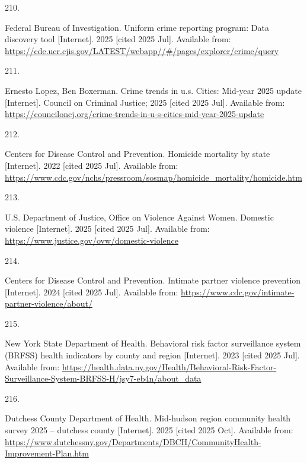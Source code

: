 \documentclass[
  english,
  letterpaper,
]{report}
\newlength{\cslhangindent}
\newlength{\csllabelwidth}
\newenvironment{CSLReferences}[2] %
 {\begin{list}{}{%
  \setlength{\itemindent}{0pt}
  \setlength{\leftmargin}{0pt}
  \setlength{\parsep}{0pt}
  \ifodd #1
   \setlength{\leftmargin}{\cslhangindent}
   \setlength{\itemindent}{-1\cslhangindent}
  \fi
  \setlength{\itemsep}{#2\baselineskip}}}
 {\end{list}}
\newcommand{\CSLLeftMargin}[1]{\parbox[t]{\csllabelwidth}{\strut#1\strut}}
\newcommand{\CSLRightInline}[1]{\parbox[t]{\linewidth - \csllabelwidth}{\strut#1\strut}}
\begin{document}
\begin{CSLReferences}{0}{1}
\CSLLeftMargin{210. }%
\CSLRightInline{Federal Bureau of Investigation. Uniform crime reporting
program: Data discovery tool {[}Internet{]}. 2025 {[}cited 2025 Jul{]}.
Available from:
\url{https://cde.ucr.cjis.gov/LATEST/webapp//\#/pages/explorer/crime/query}}

\CSLLeftMargin{211. }%
\CSLRightInline{Ernesto Lopez, Ben Boxerman. Crime trends in u.s.
Cities: Mid-year 2025 update {[}Internet{]}. Council on Criminal
Justice; 2025 {[}cited 2025 Jul{]}. Available from:
\url{https://counciloncj.org/crime-trends-in-u-s-cities-mid-year-2025-update}}

\CSLLeftMargin{212. }%
\CSLRightInline{Centers for Disease Control and Prevention. Homicide
mortality by state {[}Internet{]}. 2022 {[}cited 2025 Jul{]}. Available
from:
\url{https://www.cdc.gov/nchs/pressroom/sosmap/homicide_mortality/homicide.htm}}

\CSLLeftMargin{213. }%
\CSLRightInline{U.S. Department of Justice, Office on Violence Against
Women. Domestic violence {[}Internet{]}. 2025 {[}cited 2025 Jul{]}.
Available from: \url{https://www.justice.gov/ovw/domestic-violence}}

\CSLLeftMargin{214. }%
\CSLRightInline{Centers for Disease Control and Prevention. Intimate
partner violence prevention {[}Internet{]}. 2024 {[}cited 2025 Jul{]}.
Available from:
\url{https://www.cdc.gov/intimate-partner-violence/about/}}

\CSLLeftMargin{215. }%
\CSLRightInline{New York State Department of Health. Behavioral risk
factor surveillance system (BRFSS) health indicators by county and
region {[}Internet{]}. 2023 {[}cited 2025 Jul{]}. Available from:
\url{https://health.data.ny.gov/Health/Behavioral-Risk-Factor-Surveillance-System-BRFSS-H/jsy7-eb4n/about_data}}

\CSLLeftMargin{216. }%
\CSLRightInline{Dutchess County Department of Health. Mid-hudson region
community health survey 2025 -- dutchess county {[}Internet{]}. 2025
{[}cited 2025 Oct{]}. Available from:
\url{https://www.dutchessny.gov/Departments/DBCH/CommunityHealth-Improvement-Plan.htm}}


\end{CSLReferences}
\end{document}
